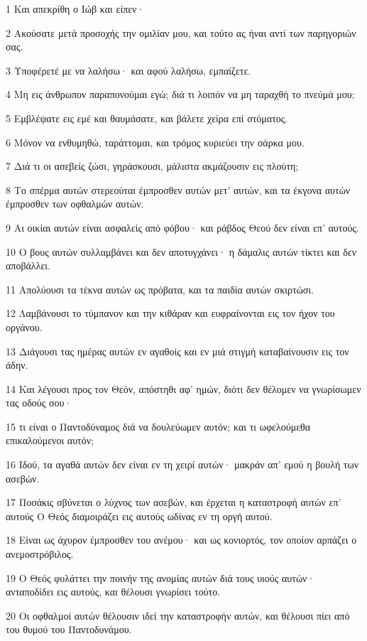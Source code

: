 \par 1 Και απεκρίθη ο Ιώβ και είπεν·
\par 2 Ακούσατε μετά προσοχής την ομιλίαν μου, και τούτο ας ήναι αντί των παρηγοριών σας.
\par 3 Υποφέρετέ με να λαλήσω· και αφού λαλήσω, εμπαίζετε.
\par 4 Μη εις άνθρωπον παραπονούμαι εγώ; διά τι λοιπόν να μη ταραχθή το πνεύμά μου;
\par 5 Εμβλέψατε εις εμέ και θαυμάσατε, και βάλετε χείρα επί στόματος.
\par 6 Μόνον να ενθυμηθώ, ταράττομαι, και τρόμος κυριεύει την σάρκα μου.
\par 7 Διά τι οι ασεβείς ζώσι, γηράσκουσι, μάλιστα ακμάζουσιν εις πλούτη;
\par 8 Το σπέρμα αυτών στερεούται έμπροσθεν αυτών μετ' αυτών, και τα έκγονα αυτών έμπροσθεν των οφθαλμών αυτών.
\par 9 Αι οικίαι αυτών είναι ασφαλείς από φόβου· και ράβδος Θεού δεν είναι επ' αυτούς.
\par 10 Ο βους αυτών συλλαμβάνει και δεν αποτυγχάνει· η δάμαλις αυτών τίκτει και δεν αποβάλλει.
\par 11 Απολύουσι τα τέκνα αυτών ως πρόβατα, και τα παιδία αυτών σκιρτώσι.
\par 12 Λαμβάνουσι το τύμπανον και την κιθάραν και ευφραίνονται εις τον ήχον του οργάνου.
\par 13 Διάγουσι τας ημέρας αυτών εν αγαθοίς και εν μιά στιγμή καταβαίνουσιν εις τον άδην.
\par 14 Και λέγουσι προς τον Θεόν, απόστηθι αφ' ημών, διότι δεν θέλομεν να γνωρίσωμεν τας οδούς σου·
\par 15 τι είναι ο Παντοδύναμος διά να δουλεύωμεν αυτόν; και τι ωφελούμεθα επικαλούμενοι αυτόν;
\par 16 Ιδού, τα αγαθά αυτών δεν είναι εν τη χειρί αυτών· μακράν απ' εμού η βουλή των ασεβών.
\par 17 Ποσάκις σβύνεται ο λύχνος των ασεβών, και έρχεται η καταστροφή αυτών επ' αυτούς Ο Θεός διαμοιράζει εις αυτούς ωδίνας εν τη οργή αυτού.
\par 18 Είναι ως άχυρον έμπροσθεν του ανέμου· και ως κονιορτός, τον οποίον αρπάζει ο ανεμοστρόβιλος.
\par 19 Ο Θεός φυλάττει την ποινήν της ανομίας αυτών διά τους υιούς αυτών· ανταποδίδει εις αυτούς, και θέλουσι γνωρίσει τούτο.
\par 20 Οι οφθαλμοί αυτών θέλουσιν ιδεί την καταστροφήν αυτών, και θέλουσι πίει από του θυμού του Παντοδυνάμου.
